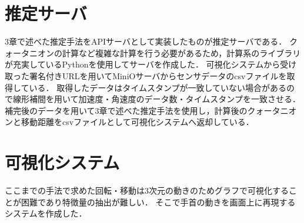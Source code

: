 \section{推定サーバ}
3章で述べた推定手法をAPIサーバとして実装したものが推定サーバである．
クォータニオンの計算など複雑な計算を行う必要があるため，計算系のライブラリが充実しているPythonを使用してサーバを作成した．
可視化システムから受け取った署名付きURLを用いてMiniOサーバからセンサデータのcsvファイルを取得している．
取得したデータはタイムスタンプが一致していない場合があるので線形補間を用いて加速度・角速度のデータ数・タイムスタンプを一致させる．
補完後のデータを用いて3章で述べた推定手法を使用し，計算後のクォータニオンと移動距離をcsvファイルとして可視化システムへ返却している．

\section{可視化システム}
ここまでの手法で求めた回転・移動は3次元の動きのためグラフで可視化することが困難であり特徴量の抽出が難しい．
そこで手首の動きを画面上に再現するシステムを作成した．